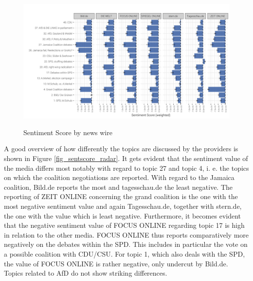 \documentclass[12pt,a4paper,notitlepage]{article}
\begin{document}
\begin{figure}[H]
	\caption{Sentiment Score by news wire}
	\begin{center}
			\includegraphics[width=\textwidth,keepaspectratio]{../figs/sentscore_site.png}
			\label{fig_sentscore_site}
	\end{center}
\end{figure}

A good overview of how differently the topics are discussed by the providers is shown in Figure \ref{fig_sentscore_radar}. It gets evident that the sentiment value of the media differs most notably with regard to topic 27 and topic 4, i. e. the topics on which the coalition negotiations are reported. With regard to the Jamaica coalition, Bild.de reports the most and tagesschau.de the least negative. The reporting of ZEIT ONLINE concerning the grand coalition is the one with the most negative sentiment value and again Tagesschau.de, together with stern.de, the one with the value which is least negative. Furthermore, it becomes evident that the negative sentiment value of FOCUS ONLINE regarding topic 17 is high in relation to the other media. FOCUS ONLINE thus reports comparatively more negatively on the debates within the SPD. This includes in particular the vote on a possible coalition with CDU/CSU. For topic 1, which also deals with the SPD, the value of FOCUS ONLINE is rather negative, only undercut by Bild.de. Topics related to AfD do not show striking differences. 
\end{document}
